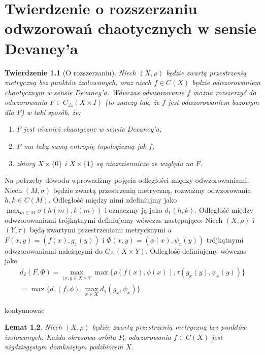 \documentclass[licencjacka]{pwr_wmat_praca_dyplomowa}
\theoremstyle{plain}
\newtheorem{theorem}{Twierdzenie}
\numberwithin{theorem}{chapter}
\newtheorem{lemma}[theorem]{Lemat}
\theoremstyle{definition}
\numberwithin{theorem}{chapter}
\begin{document}
\chapter{Twierdzenie o rozszerzaniu odwzorowań chaotycznych w sensie Devaney'a}
\begin{theorem}[O rozszerzaniu]\label{twierdzenie_glowne}
Niech $(X, \rho)$ będzie zwartą przestrzenią metryczną bez punktów izolowanych, oraz niech $f \in C(X)$ będzie odwzorowaniem chaotycznym w sensie Devaney'a. Wówczas odwzorowanie $f$ można rozszerzyć do odwzorowania $F \in C_{\triangle}(X \times I)$ (to znaczy tak, że $f$ jest odwzorowaniem bazowym dla $F$) w taki sposób, że:
\begin{enumerate}[label=(\roman*)]
\item\label{twierdzenie_glowne_a} $F$ jest również chaotyczne w sensie Devaney'a, 
\item\label{twierdzenie_glowne_b} $F$ ma taką samą entropię topologiczną jak $f$, 
\item\label{twierdzenie_glowne_c} zbiory $X \times \{0\}$ i $X \times \{1\}$ są niezmiennicze ze względu na $F$.
\end{enumerate}
\end{theorem}
\cite{balibrea2003topological}

Na potrzeby dowodu wprowadźmy pojęcia odległości między odwzorowaniami. Niech $(M, \sigma)$ będzie zwartą przestrzenią metryczną, rozważmy odwzorowania $h,k \in C(M)$. Odległość między nimi zdefiniujmy jako $\max_{m \in M} \sigma(h(m), k(m))$ i oznaczmy ją jako $d_1(h,k)$.
Odległość między odwzorowaniami trójkątnymi definiujemy wówczas następująco: Niech $(X, \rho)$ i $(Y, \tau)$ będą zwartymi przestrzeniami metrycznymi a $F(x,y) = (f(x), g_x(y))$ i $\Phi(x,y) = (\phi(x), \psi_x(y))$ trójkątnymi odwzorowaniami należącymi do $C_\triangle(X \times Y)$. Odległość definiujemy wówczas jako 
\begin{align*}
d_2(F, \Phi) = \max_{(x,y \in X \times Y} \max\{\rho(f(x),\phi(x)), \tau(g_x(y), \psi_x(y))\} \\ 
= \max\{d_1(f,\phi), \max_{x \in X}d_1(g_x, \psi_x)\}
\end{align*}




 kontynuowac


\begin{lemma}\label{nigdziegestosc_orbit}
Niech  $(X, \rho)$ będzie zwartą przestrzenią metryczną bez punktów izolowanych. Każda okresowa orbita $P_0$ odwzorowania $f \in C(X)$ jest nigdziegęstym domkniętym podzbiorem $X$.
\end{lemma}
\end{document}

